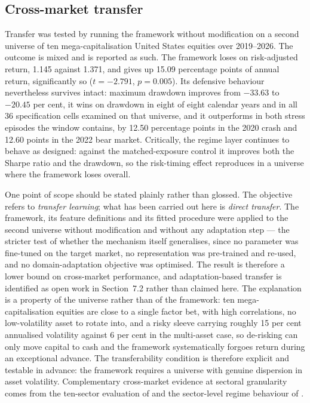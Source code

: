 \subsection{Cross-market transfer}

Transfer was tested by running the framework without modification on a second universe of ten
mega-capitalisation United States equities over 2019--2026. The outcome is mixed and is reported
as such. The framework loses on risk-adjusted return, 1.145 against 1.371, and gives up 15.09
percentage points of annual return, significantly so ($t = -2.791$, $p = 0.005$). Its defensive
behaviour nevertheless survives intact: maximum drawdown improves from $-33.63$ to $-20.45$ per
cent, it wins on drawdown in eight of eight calendar years and in all 36 specification cells
examined on that universe, and it outperforms in both stress episodes the window contains, by
12.50 percentage points in the 2020 crash and 12.60 points in the 2022 bear market. Critically,
the regime layer continues to behave as designed: against the matched-exposure control it
improves both the Sharpe ratio and the drawdown, so the risk-timing effect reproduces in a
universe where the framework loses overall.

One point of scope should be stated plainly rather than glossed. The objective refers to
\emph{transfer learning}; what has been carried out here is \emph{direct transfer}. The
framework, its feature definitions and its fitted procedure were applied to the second universe
without modification and without any adaptation step --- the stricter test of whether the
mechanism itself generalises, since no parameter was fine-tuned on the target market, no
representation was pre-trained and re-used, and no domain-adaptation objective was optimised.
The result is therefore a lower bound on cross-market performance, and adaptation-based transfer
is identified as open work in Section~7.2 rather than claimed here. The explanation is a
property of the universe rather than of the framework: ten mega-capitalisation equities are
close to a single factor bet, with high correlations, no low-volatility asset to rotate into,
and a risky sleeve carrying roughly 15 per cent annualised volatility against 6 per cent in the
multi-asset case, so de-risking can only move capital to cash and the framework systematically
forgoes return during an exceptional advance. The transferability condition is therefore
explicit and testable in advance: the framework requires a universe with genuine dispersion in
asset volatility. Complementary cross-market evidence at sectoral granularity comes from the
ten-sector evaluation of  and the sector-level regime behaviour of .

